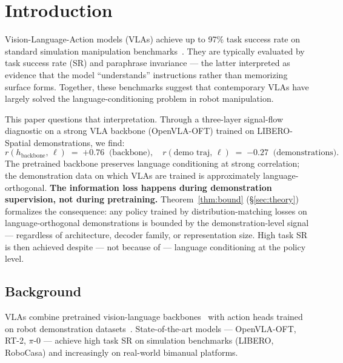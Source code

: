 
\section{Introduction}
\label{sec:introduction}

Vision-Language-Action models (VLAs) achieve up to 97\% task success rate on standard
simulation manipulation benchmarks~\cite{kim2025openvla_oft, black2024pi0}. They are
typically evaluated by task success rate (SR) and paraphrase invariance --- the latter
interpreted as evidence that the model ``understands'' instructions rather than memorizing
surface forms. Together, these benchmarks suggest that contemporary VLAs have largely
solved the language-conditioning problem in robot manipulation.

This paper questions that interpretation. Through a three-layer signal-flow diagnostic
on a strong VLA backbone (OpenVLA-OFT) trained on LIBERO-Spatial demonstrations, we find:
\begin{equation}
r(h_{\mathrm{backbone}},\, \ell) \;=\; \mathbf{+0.76}\;\;\text{(backbone)},
\quad
r(\text{demo traj},\, \ell) \;=\; \mathbf{-0.27}\;\;\text{(demonstrations)}.
\label{eq:hook}
\end{equation}
The pretrained backbone preserves language conditioning at strong correlation; the
demonstration data on which VLAs are trained is approximately language-orthogonal.
\textbf{The information loss happens during demonstration supervision, not during pretraining.}
Theorem~\ref{thm:bound} (\S\ref{sec:theory}) formalizes the consequence: any policy
trained by distribution-matching losses on language-orthogonal demonstrations is bounded
by the demonstration-level signal --- regardless of architecture, decoder family, or
representation size. High task SR is then achieved despite --- not because of ---
language conditioning at the policy level.

\subsection{Background}
\label{sec:intro:background}

VLAs combine pretrained vision-language backbones~\cite{driess2023palm_e, karamcheti2024prismatic}
with action heads trained on robot demonstration datasets~\cite{brohan2023rt2, kim2024openvla,
kim2025openvla_oft, black2024pi0}. State-of-the-art models --- OpenVLA-OFT, RT-2, $\pi$-0 ---
achieve high task SR on simulation benchmarks (LIBERO, RoboCasa) and increasingly on real-world
bimanual platforms.

